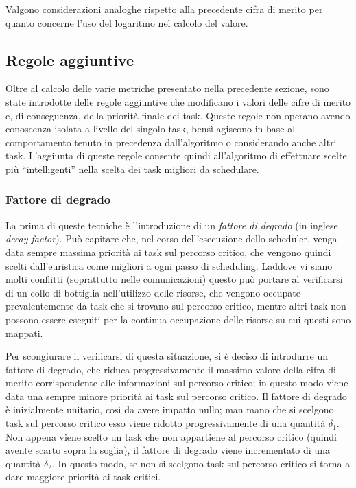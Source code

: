 Valgono considerazioni analoghe rispetto alla precedente cifra di merito 
per quanto concerne l'uso del logaritmo nel calcolo del valore.

\subsection{Regole aggiuntive}
Oltre al calcolo delle varie metriche presentato nella precedente sezione, sono 
state introdotte delle regole aggiuntive che modificano i valori delle cifre di 
merito e, di conseguenza, della priorità finale dei task. Queste regole non 
operano avendo conoscenza isolata a livello del singolo task, bensì agiscono in 
base al comportamento tenuto in precedenza dall'algoritmo o considerando anche 
altri task. L'aggiunta di queste regole consente quindi all'algoritmo di 
effettuare scelte più ``intelligenti'' nella scelta dei task migliori da 
schedulare.

\subsubsection{Fattore di degrado}
La prima di queste tecniche è l'introduzione di un \emph{fattore di degrado} 
(in inglese \emph{decay factor}). Può capitare che, nel corso dell'esecuzione 
dello scheduler, venga data sempre massima priorità ai task sul percorso 
critico, che vengono quindi scelti dall'euristica come migliori a ogni passo di 
scheduling. Laddove vi siano molti conflitti (soprattutto nelle comunicazioni) 
questo può portare al verificarsi di un collo di bottiglia nell'utilizzo delle 
risorse, che vengono occupate prevalentemente da task che si trovano sul 
percorso critico, mentre altri task non possono essere eseguiti per la continua 
occupazione delle risorse su cui questi sono mappati.

Per scongiurare il verificarsi di questa situazione, si è deciso di introdurre 
un fattore di degrado, che riduca progressivamente il massimo valore della 
cifra di merito corrispondente alle informazioni sul percorso critico; in 
questo modo viene data una sempre minore priorità ai task sul percorso critico. 
Il fattore di degrado è inizialmente unitario, così da avere impatto nullo; man 
mano che si scelgono task sul percorso critico esso viene ridotto 
progressivamente di una quantità $\delta_1$. Non appena viene scelto un 
task che non appartiene al percorso critico (quindi avente scarto sopra la 
soglia), il fattore di degrado viene incrementato di una quantità $\delta_2$. 
In questo modo, se non si scelgono task sul percorso critico si torna a dare 
maggiore priorità ai task critici.

